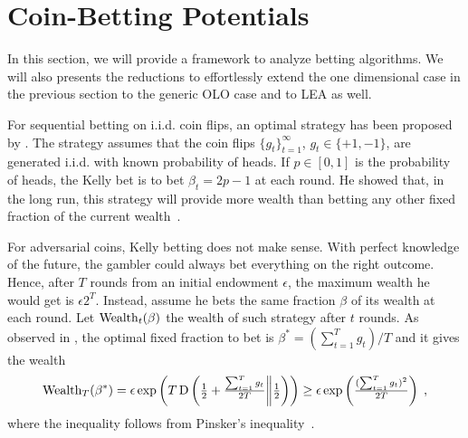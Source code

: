 \section{Coin-Betting Potentials}
\label{section:coin-betting-potentials}

In this section, we will provide a framework to analyze betting algorithms.  We
will also presents the reductions to effortlessly extend the one dimensional
case in the previous section to the generic \ac{OLO} case and to \ac{LEA} as
well.

For sequential betting on i.i.d. coin flips, an optimal strategy has been
proposed by \citet{Kelly-1956}.  The strategy assumes that the coin flips
$\{g_t\}_{t=1}^\infty$, $g_t \in \{+1,-1\}$, are generated i.i.d. with known
probability of heads. If $p \in [0,1]$ is the probability of heads, the Kelly
bet is to bet $\beta_t = 2p - 1$ at each round. He showed that, in the long run, this strategy will
provide more wealth than betting any other fixed fraction of the current wealth~\cite{Kelly-1956}.

For adversarial coins, Kelly betting does not make sense. With perfect
knowledge of the future, the gambler could always bet everything on the right
outcome.  Hence, after $T$ rounds from an initial endowment $\epsilon$, the
maximum wealth he would get is $\epsilon 2^T$.  Instead, assume he bets the
same fraction $\beta$ of its wealth at each round.
Let $\operatorname{Wealth}_t(\beta)$ the wealth of such strategy after $t$ rounds. 
As observed in \cite{McMahan-Abernethy-2013},
the optimal fixed fraction to bet is $\beta^*=(\sum_{t=1}^T g_t)/T$ and it
gives the wealth
\begin{equation}
\label{eq:opt_wealth}
\operatorname{Wealth}_T(\beta^*)
= \epsilon \exp\left(T \operatorname{D}\left({\tfrac{1}{2}+\tfrac{\sum_{t=1}^T g_t}{2T}}\middle\|{\tfrac{1}{2}}\right)\right)
\geq \epsilon \exp\left(\tfrac{(\sum_{t=1}^T g_t)^2}{2 T}\right) \; ,
\end{equation}
where the inequality follows from Pinsker's inequality~\citep[Lemma
11.6.1]{Cover-Thomas-2006}.

